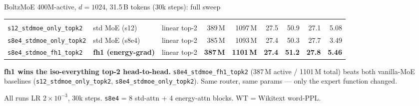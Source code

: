 \documentclass[aspectratio=169,10pt]{beamer}
\begin{document}
\begin{frame}{BoltzMoE 400M-active, $d{=}1024$, 31.5\,B tokens (30k steps): full sweep}
\begin{center}
\begin{tabular}{@{}llcrrrrrr@{}}
\midrule
\rowcolor{cGray10}
\multicolumn{9}{l}{\textit{\color{cTextSec}Standard TopK-MoE (s8e4, \textbf{top-2}) --- iso-everything head-to-head}} \\
\texttt{s12\_stdmoe\_only\_topk2}       & std MoE (s12)         & linear top-2 & 389\,M & 1097\,M    & 27.5          & 50.9          & 27.1          & 5.08 \\
\texttt{s8e4\_stdmoe\_only\_topk2}      & std MoE (s8e4)        & linear top-2 & 385\,M & 1093\,M    & 27.4          & 50.3          & 27.7          & 3.49 \\
\rowcolor{cGreen50!12}
\texttt{s8e4\_stdmoe\_fh1\_topk2}       & \textbf{fh1 (energy-grad)} & linear top-2 & \textbf{387\,M} & \textbf{1101\,M} & \textbf{27.4} & \textbf{51.2} & \textbf{27.8} & \textbf{5.46} \\
\bottomrule
\end{tabular}
\end{center}

\vspace{-2pt}
\begin{egpttile}
\textbf{fh1 wins the iso-everything top-2 head-to-head.}
\texttt{s8e4\_stdmoe\_fh1\_topk2} (387\,M active / 1101\,M total) beats both
vanilla-MoE baselines (\texttt{s12\_stdmoe\_only\_topk2}, \texttt{s8e4\_stdmoe\_only\_topk2}).
Same router, same params --- only the expert function changed.
\end{egpttile}

\vspace{1pt}
{\sffamily\tiny\color{cTextSec}\hfill
All runs LR $2{\times}10^{-3}$, 30k steps. \;
\texttt{s8e4} = 8 std-attn + 4 energy-attn blocks. \;
WT = Wikitext word-PPL.\hfill\hfill}
\end{frame}
\end{document}
